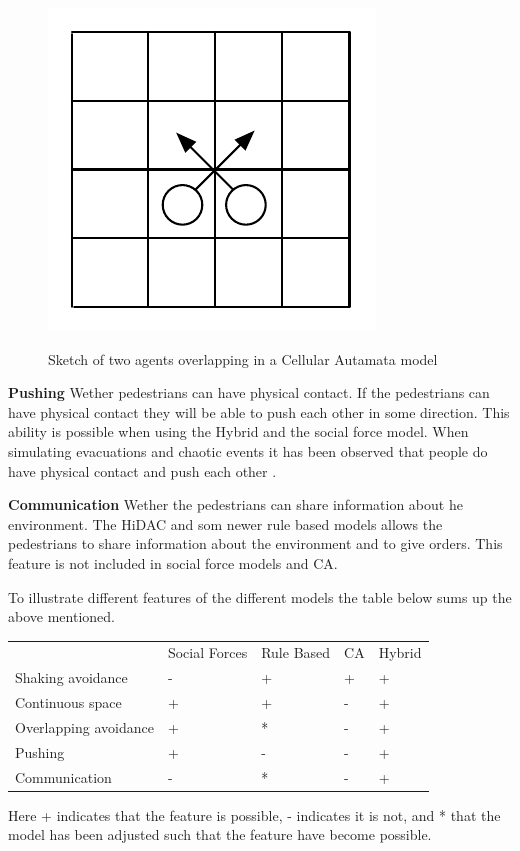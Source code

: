 \begin{figure}
    \centering
    {\includegraphics[scale=0.55]{Figures/Overlapping.pdf}} 
    \caption{Sketch of two agents overlapping in a Cellular Autamata model}
    \label{Overlapping}
\end{figure}

\textbf{Pushing} Wether pedestrians can have physical contact. If the pedestrians can have physical contact they will be able to push each other in some
direction. This ability is possible when using the Hybrid and the social force model. When simulating evacuations and chaotic events it has been observed
that people do have physical contact and push each other \cite{self-org}.

\textbf{Communication} Wether the pedestrians can share information about he environment. The HiDAC and som newer rule based models allows the pedestrians
to share information about the environment and to give orders. This feature is not included in social force models and CA. \cite{Comparison}

To illustrate different features of the different models the table below sums up the above mentioned.
\begin{center}
\begin{tabular}{lllll}
 & Social Forces & Rule Based & CA & Hybrid\\
Shaking avoidance     & - & + & + & +\\
Continuous space      & + & + & - & +\\
Overlapping avoidance & + & * & - & +\\
Pushing               & + & - & - & +\\
Communication         & - & * & - & +
\end{tabular}
\end{center}
Here + indicates that the feature is possible, - indicates it is not, and * that the model has been adjusted such that the feature have
become possible. \cite{Comparison}

